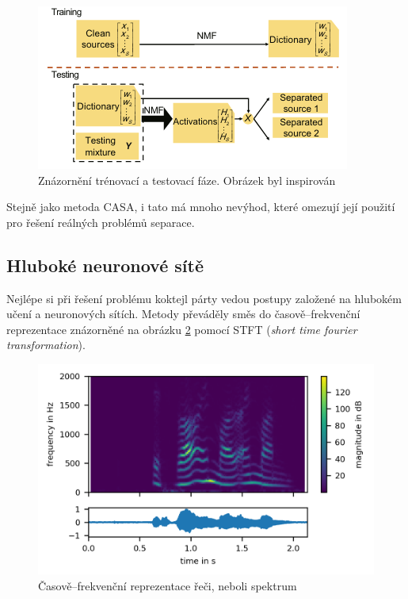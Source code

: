 \begin{figure}[H]
    \centering
    \includegraphics[scale=0.6]{obrazky-figures/nmf.png}
    \caption{\label{fig:nmf}Znázornění trénovací a testovací fáze. Obrázek byl inspirován \cite{speechseparation}}
\end{figure}

Stejně jako metoda CASA, i tato má mnoho nevýhod, které omezují její použití pro řešení reálných problémů separace.



\subsection{Hluboké neuronové sítě}
Nejlépe si při řešení problému koktejl párty vedou postupy založené na hlubokém učení a neuronových sítích.
Metody převáděly směs do časově--frekvenční reprezentace znázorněné na obrázku \ref{fig:spektrum} pomocí STFT (\textit{short time fourier transformation}).

\begin{figure}[H]
    \centering
    \includegraphics[scale=0.6]{obrazky-figures/spektrum.png}
    \caption{\label{fig:spektrum}Časově--frekvenční reprezentace řeči, neboli spektrum}
\end{figure}




